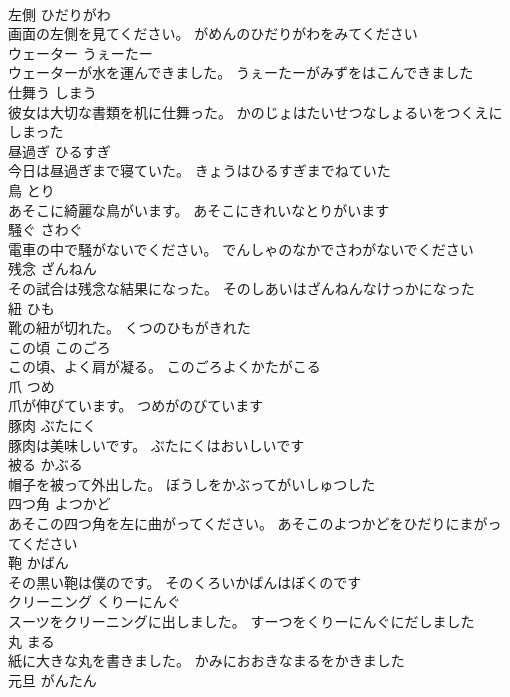 \documentclass[8pt]{extreport}
\begin{document}
\begin{CJK}{UTF8}{min}
\\	左側	ひだりがわ	
\\	画面の左側を見てください。	がめんのひだりがわをみてください	
\\	ウェーター	うぇーたー	
\\	ウェーターが水を運んできました。	うぇーたーがみずをはこんできました	
\\	仕舞う	しまう	
\\	彼女は大切な書類を机に仕舞った。	かのじょはたいせつなしょるいをつくえにしまった	
\\	昼過ぎ	ひるすぎ	
\\	今日は昼過ぎまで寝ていた。	きょうはひるすぎまでねていた	
\\	鳥	とり	
\\	あそこに綺麗な鳥がいます。	あそこにきれいなとりがいます	
\\	騒ぐ	さわぐ	
\\	電車の中で騒がないでください。	でんしゃのなかでさわがないでください	
\\	残念	ざんねん	
\\	その試合は残念な結果になった。	そのしあいはざんねんなけっかになった	
\\	紐	ひも	
\\	靴の紐が切れた。	くつのひもがきれた	
\\	この頃	このごろ	
\\	この頃、よく肩が凝る。	このごろよくかたがこる	
\\	爪	つめ	
\\	爪が伸びています。	つめがのびています	
\\	豚肉	ぶたにく	
\\	豚肉は美味しいです。	ぶたにくはおいしいです	
\\	被る	かぶる	
\\	帽子を被って外出した。	ぼうしをかぶってがいしゅつした	
\\	四つ角	よつかど	
\\	あそこの四つ角を左に曲がってください。	あそこのよつかどをひだりにまがってください	
\\	鞄	かばん	
\\	その黒い鞄は僕のです。	そのくろいかばんはぼくのです	
\\	クリーニング	くりーにんぐ	
\\	スーツをクリーニングに出しました。	すーつをくりーにんぐにだしました	
\\	丸	まる	
\\	紙に大きな丸を書きました。	かみにおおきなまるをかきました	
\\	元旦	がんたん	

\end{CJK}
\end{document}
